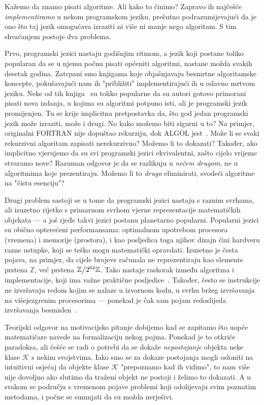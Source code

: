 Kažemo da znamo pisati algoritme. Ali kako to činimo? Zapravo ih najčešće \emph{implementiramo} u nekom programskom jeziku, prešutno podrazumijevajući da je ono što taj jezik omogućava izraziti ni više ni manje nego algoritam. S tim shvaćanjem postoje dva problema.

Prvo, programski jezici nastaju godišnjim ritmom, a jezik koji postane toliko popularan da se u njemu počnu pisati općeniti algoritmi, nastane možda svakih desetak godina. Zatrpani smo knjigama koje objašnjavaju besmrtne algoritamske koncepte, pokušavajući nam ih "približiti" implementirajući ih u odavno mrtvom jeziku. Neke od tih knjiga~\cite{sedgewick} su toliko popularne da su autori gotovo primorani pisati nova izdanja, u kojima su algoritmi potpuno isti, ali je programski jezik promijenjen. Tu se krije implicitna pretpostavka da, što god jedan programski jezik može izraziti, može i drugi. No kako možemo biti sigurni u to? Na primjer, originalni FORTRAN nije dopuštao rekurziju, dok ALGOL jest~\cite{url:recursionAlgol}. Može li se svaki rekurzivni algoritam zapisati nerekurzivno? Možemo li to dokazati? Također, ako implicitno vjerujemo da su svi programski jezici ekvivalentni, zašto cijelo vrijeme stvaramo nove? Razuman odgovor je da se razlikuju u \emph{nečem drugom}, ne u algoritmima koje prezentiraju. Možemo li to \emph{drugo} eliminirati, svodeći algoritme na "čistu esenciju"?

Drugi problem sastoji se u tome da programski jezici nastaju s raznim svrhama, ali izuzetno rijetko s primarnom svrhom vjerne reprezentacije matematičkih objekata --- a još rjeđe takvi jezici postanu planetarno popularni. Popularni jezici su obično opterećeni performansama: optimalnom upotrebom procesora (vremena) i memorije (prostora), i kao posljedica toga njihov dizajn čini hardveru razne ustupke, koji se teško mogu matematički opravdati. Izuzetno je česta pojava, na primjer, da cijele brojeve računala ne reprezentiraju kao elemente prstena $\mathbb Z$, već prstena $\mathbb Z\big\slash2^{64}\mathbb Z$. Tako nastaje raskorak između algoritma i implementacije, koji ima važne praktične posljedice~\cite{url:wrongBinsearch}. Također, često se instrukcije ne izvršavaju redom kojim se nalaze u izvornom kodu, u svrhu bržeg izvršavanja na višejezgrenim procesorima --- ponekad je čak sam pojam redoslijeda izvršavanja besmislen~\cite[str.\ 10]{art:memorymodels}.

Teorijski odgovor na motivacijsko pitanje dobijemo kad se zapitamo što uopće matematičare navede na formalizaciju nekog pojma. Ponekad je to otkriće paradoksa, ali češće se radi o potrebi da se dokaže \emph{nepostojanje} objekta neke klase $\mathcal K$ s nekim svojstvima. Iako smo se za dokaze postojanja mogli osloniti na intuitivni osjećaj da objekte klase $\mathcal K$ "prepoznamo kad ih vidimo", to nam više nije dovoljno ako slutimo da traženi objekt ne postoji i želimo to dokazati. A u svakom se području s vremenom pojave problemi koji odolijevaju svim poznatim metodama, i počne se sumnjati da su možda nerješivi.


